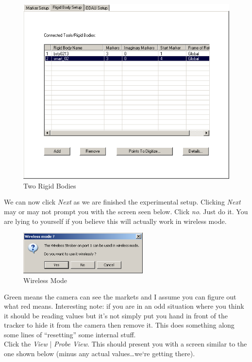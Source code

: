 \documentclass[pdftex,11pt,letterpaper]{article}
\begin{document}
\begin{figure}[ht!]
\centering
\includegraphics[width=150mm]{./images/ridges}
\caption{Two Rigid Bodies}
\end{figure}

We can now click \textit{Next} as we are finished the experimental setup. Clicking \textit{Next} may or may not prompt you with the screen seen below. Click \textit{no}. Just do it. You are lying to yourself if you believe this will actually work in wireless mode.  

\begin{figure}[ht!]
\centering
\includegraphics[width=65mm]{./images/wireless}
\caption{Wireless Mode}
\end{figure}

Green means the camera can see the markets and I assume you can figure out what red means. Interesting note: if you are in an odd situation where you think it should be reading values but it's not simply put you hand in front of the tracker to hide it from the camera then remove it. This does something along some lines of “resetting” some internal stuff. \\

Click the \textit{View} | \textit{Probe View}. This should present you with a screen similar to the one shown below (minus any actual values…we`re getting there). 
\end{document}
